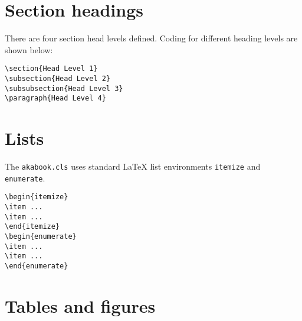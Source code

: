 \documentclass{ltxdoc}
\def\file#1{\texttt{#1}}
\begin{document}
\section{Section headings}

There are four section head levels defined. Coding for different heading levels are shown below:
\begin{Verbatim}
\section{Head Level 1}
\subsection{Head Level 2}
\subsubsection{Head Level 3}
\paragraph{Head Level 4}
\end{Verbatim}


\section{Lists}

The \file{akabook.cls} uses standard LaTeX list environments \texttt{itemize} and \texttt{enumerate}.
\begin{Verbatim}
\begin{itemize}
\item ...
\item ...
\end{itemize}
\begin{enumerate}
\item ...
\item ...
\end{enumerate}
\end{Verbatim}


\section{Tables and figures}
\end{document}
